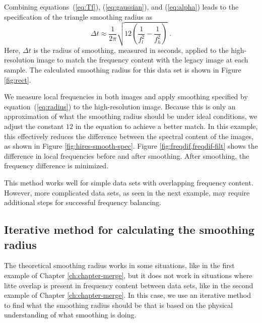         Combining equations~(\ref{eq:Tf}), (\ref{eq:gaussian}), and (\ref{eq:alpha}) leads to the specification of the triangle smoothing radius as
        \begin{equation}
            \label{eq:radius}
            \Delta t \approx \frac{1}{2\pi}\sqrt{12\left(\frac{1}{f_{l}^{2}}-\frac{1}{f_{h}^{2}}\right)}\;.
        \end{equation}
        Here, $\Delta t$ is the radius of smoothing, measured in seconds, applied to the high-resolution image to match the frequency content with the legacy image at each sample. 
        The calculated smoothing radius for this data set is shown in Figure \ref{fig:rect}.
        
        
        We measure local frequencies in both images and apply smoothing specified by equation~(\ref{eq:radius}) to the high-resolution image.
        Because this is only an approximation of what the smoothing radius should be under ideal conditions, we adjust the constant $12$ in the equation to achieve a better match. 
        In this example, this effectively reduces the difference between the spectral content of the images, as shown in Figure \ref{fig:hires-smooth-spec}. 
        Figure \ref{fig:freqdif,freqdif-filt} shows the difference in local frequencies before and after smoothing. 
        After smoothing, the frequency difference is minimized. 
        
        This method works well for simple data sets with overlapping frequency content. 
        However, more complicated data sets, as seen in the next example, may require additional steps for successful frequency balancing.



        \subsection{Iterative method for calculating the smoothing radius}
        The theoretical smoothing radius works in some situations, like in the first example of Chapter \ref{ch:chapter-merge}, but it does not work in situations where litte overlap is present in frequency content between data sets, like in the second example of Chapter \ref{ch:chapter-merge}.
        In this case, we use an iterative method to find what the smoothing radius should be that is based on the physical understanding of what smoothing is doing.

